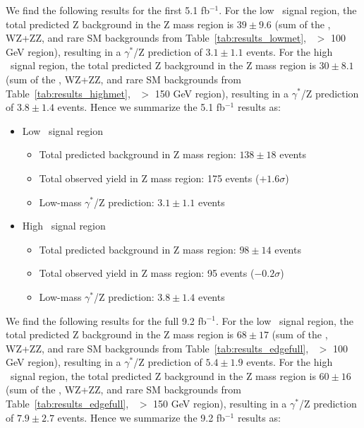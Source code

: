 \clearpage

We find the following results for the first 5.1 fb$^{-1}$. For the low \MET\ signal region, the total predicted Z background in the Z mass region is $39\pm9.6$ 
(sum of the \zjets, WZ+ZZ, and rare SM backgrounds from Table~\ref{tab:results_lowmet}, \MET\ $>$ 100 GeV region), 
resulting in a $\gamma^*$/Z prediction of $3.1\pm1.1$ events. 
For the high \MET\ signal region, the total predicted Z background in the Z mass region is $30\pm8.1$ 
(sum of the \zjets, WZ+ZZ, and rare SM backgrounds from Table~\ref{tab:results_highmet}, \MET\ $>$ 150 GeV region), 
resulting in a $\gamma^*$/Z prediction of $3.8\pm1.4$ events. 
Hence we summarize the 5.1 fb$^{-1}$ results as:

\begin{itemize}
\item Low \MET\ signal region
\begin{itemize}
  \item Total predicted background in Z mass region: $138\pm18$ events
  \item Total observed yield in Z mass region: 175 events ($+1.6\sigma$)
  \item Low-mass $\gamma^*$/Z prediction: $3.1\pm1.1$ events
\end{itemize}
\item High \MET\ signal region
\begin{itemize}
  \item Total predicted background in Z mass region: $98\pm14$ events
  \item Total observed yield in Z mass region: 95 events ($-0.2\sigma$)
  \item Low-mass $\gamma^*$/Z prediction: $3.8\pm1.4$ events
\end{itemize}
\end{itemize}

We find the following results for the full 9.2 fb$^{-1}$. For the low \MET\ signal region, the total predicted Z background in the Z mass region is $68\pm17$ 
(sum of the \zjets, WZ+ZZ, and rare SM backgrounds from Table~\ref{tab:results_edgefull}, \MET\ $>$ 100 GeV region), 
resulting in a $\gamma^*$/Z prediction of $5.4\pm1.9$ events. 
For the high \MET\ signal region, the total predicted Z background in the Z mass region is $60\pm16$ 
(sum of the \zjets, WZ+ZZ, and rare SM backgrounds from Table~\ref{tab:results_edgefull}, \MET\ $>$ 150 GeV region), 
resulting in a $\gamma^*$/Z prediction of $7.9\pm2.7$ events. 
Hence we summarize the 9.2 fb$^{-1}$ results as:

